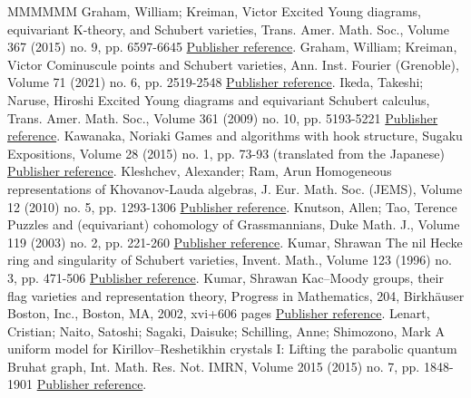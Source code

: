 \documentclass[11pt]{article}
\theoremstyle{definition}
\numberwithin{equation}{section}
\begin{document}
\begin{thebibliography}{MMMMMM}
 Graham, William; Kreiman, Victor Excited Young diagrams, equivariant K-theory, and Schubert varieties, Trans. Amer. Math. Soc., Volume 367 (2015) no. 9, pp. 6597-6645 \href{https://alco.centre-mersenne.org/articles/10.5802/alco.428/#graham.kreiman:excited}{Publisher reference}.
 Graham, William; Kreiman, Victor Cominuscule points and Schubert varieties, Ann. Inst. Fourier (Grenoble), Volume 71 (2021) no. 6, pp. 2519-2548 \href{https://alco.centre-mersenne.org/articles/10.5802/alco.428/#graham.kreiman:cominuscule_pt}{Publisher reference}.
 Ikeda, Takeshi; Naruse, Hiroshi Excited Young diagrams and equivariant Schubert calculus, Trans. Amer. Math. Soc., Volume 361 (2009) no. 10, pp. 5193-5221 \href{https://alco.centre-mersenne.org/articles/10.5802/alco.428/#ikeda2009excited}{Publisher reference}.
 Kawanaka, Noriaki Games and algorithms with hook structure, Sugaku Expositions, Volume 28 (2015) no. 1, pp. 73-93 (translated from the Japanese) \href{https://alco.centre-mersenne.org/articles/10.5802/alco.428/#Kaw15}{Publisher reference}.
 Kleshchev, Alexander; Ram, Arun Homogeneous representations of Khovanov-Lauda algebras, J. Eur. Math. Soc. (JEMS), Volume 12 (2010) no. 5, pp. 1293-1306 \href{https://alco.centre-mersenne.org/articles/10.5802/alco.428/#kleschchev.ram}{Publisher reference}.
 Knutson, Allen; Tao, Terence Puzzles and (equivariant) cohomology of Grassmannians, Duke Math. J., Volume 119 (2003) no. 2, pp. 221-260 \href{https://alco.centre-mersenne.org/articles/10.5802/alco.428/#knutson.tao:puzzles}{Publisher reference}.
 Kumar, Shrawan The nil Hecke ring and singularity of Schubert varieties, Invent. Math., Volume 123 (1996) no. 3, pp. 471-506 \href{https://alco.centre-mersenne.org/articles/10.5802/alco.428/#kumar1996nil}{Publisher reference}.
 Kumar, Shrawan Kac–Moody groups, their flag varieties and representation theory, Progress in Mathematics, 204, Birkhäuser Boston, Inc., Boston, MA, 2002, xvi+606 pages \href{https://alco.centre-mersenne.org/articles/10.5802/alco.428/#kumar:book}{Publisher reference}.
 Lenart, Cristian; Naito, Satoshi; Sagaki, Daisuke; Schilling, Anne; Shimozono, Mark A uniform model for Kirillov–Reshetikhin crystals I: Lifting the parabolic quantum Bruhat graph, Int. Math. Res. Not. IMRN, Volume 2015 (2015) no. 7, pp. 1848-1901 \href{https://alco.centre-mersenne.org/articles/10.5802/alco.428/#LNSSS}{Publisher reference}.

\end{thebibliography}
\end{document}
